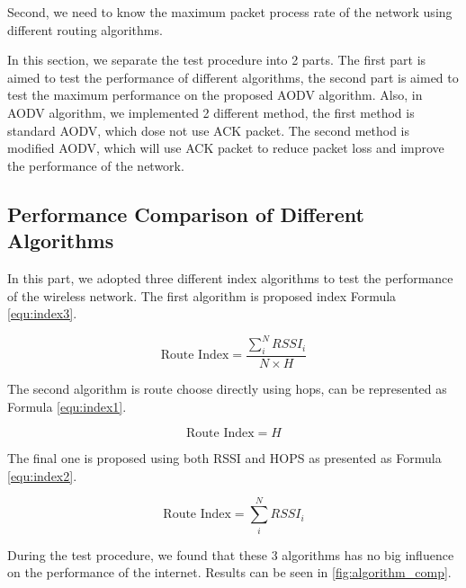 Second, we need to know the maximum packet process rate of the network using different routing algorithms.

In this section, we separate the test procedure into 2 parts. The first part is aimed to test the performance of different algorithms, the second part is aimed to test the maximum performance on the proposed AODV algorithm. Also, in AODV algorithm, we implemented 2 different method, the first method is standard AODV, which dose not use ACK packet. The second method is modified AODV, which will use ACK packet to reduce packet loss and improve the performance of the network.

\subsection{Performance Comparison of Different Algorithms}

In this part, we adopted three different index algorithms to test the performance of the wireless network.
The first algorithm is proposed index Formula \ref{equ:index3}.

\begin{equation}
    \text{Route Index} = 
    \frac{\sum_i^N{RSSI_i}}{N \times H}
\label{equ:index3}
\end{equation}

The second algorithm is route choose directly using hops, can be represented as Formula \ref{equ:index1}.

\begin{equation}
    \text{Route Index} = H
\label{equ:index1}
\end{equation}

The final one is proposed using both RSSI and HOPS as presented as Formula \ref{equ:index2}.

\begin{equation}
    \text{Route Index} = 
    {\sum_i^N{RSSI_i}}
\label{equ:index2}
\end{equation}

During the test procedure, we found that these 3 algorithms has no big influence on  the performance of the internet. Results can be seen in \ref{fig:algorithm_comp}. 

